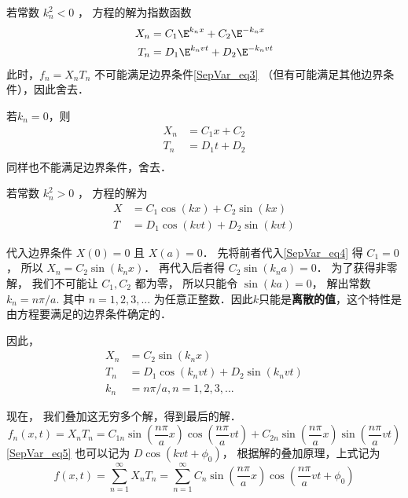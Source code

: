 若常数 $k_n^2 < 0$ ， 方程的解为指数函数
\begin{align}
X_n &= C_1 \E^{k_nx} + C_2 \E^{-k_nx}\\
T_n &= D_1 \E^{k_nvt} + D_2 \E^{-k_nvt}
\end{align}
此时，$f_n = X_nT_n$ 不可能满足边界条件\autoref{SepVar_eq3}  （但有可能满足其他边界条件），因此舍去．

若$k_n=0$，则
\begin{align}
X_n &= C_1x+C_2\\
T_n &= D_1t+D_2\\
\end{align}
同样也不能满足边界条件，舍去．

若常数 $k_n^2 > 0$ ， 方程的解为
\begin{align}\label{SepVar_eq4}
X &= C_1 \cos(kx) + C_2 \sin(kx)\\
\label{SepVar_eq5}T &= D_1 \cos(kvt) + D_2 \sin(kvt)
\end{align}

代入边界条件 $X(0) = 0$ 且 $X(a) = 0$． 先将前者代入\autoref{SepVar_eq4} 得 $C_1 = 0$， 所以 $X_n = C_2\sin(k_nx)$． 再代入后者得 $C_2\sin(k_na) = 0$． 为了获得非零解， 我们不可能让 $C_1, C_2$ 都为零， 所以只能令 $\sin(ka) = 0$， 解出常数 $k_n = n\pi/a$. 其中 $n=1,2,3,...$ 为任意正整数．因此$k$只能是\textbf{离散的值}，这个特性是由方程要满足的边界条件确定的．

因此，
\begin{align}
X_n &= C_2 \sin(k_nx)\\
T_n &= D_1 \cos(k_nvt) + D_2 \sin(k_nvt)\\
k_n & = n\pi/a, n=1,2,3,...
\end{align}

现在， 我们叠加这无穷多个解，得到最后的解．
\begin{equation}
f_n(x, t) = X_n T_n = C_{1n} \sin(\frac{n\pi}{a}x)\cos(\frac{n\pi}{a} vt) + C_{2n}\sin(\frac{n\pi}{a}x)\sin(\frac{n\pi}{a}vt)
\end{equation}
\autoref{SepVar_eq5} 也可以记为 $D\cos(kvt+\phi_0)$， 根据解的叠加原理，上式记为
\begin{equation}
f(x, t) = \sum_{n=1}^\infty X_nT_n = \sum_{n=1}^\infty C_n\sin(\frac{n\pi}{a}x)\cos(\frac{n\pi}{a}vt + \phi_0)
\end{equation}

